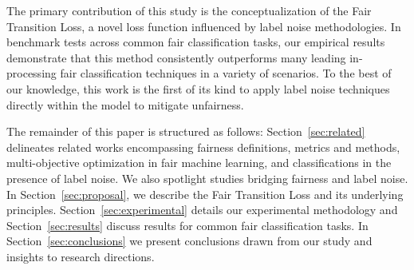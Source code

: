 The primary contribution of this study is the conceptualization of the Fair Transition Loss, a novel loss function influenced by label noise methodologies. In benchmark tests across common fair classification tasks, our empirical results demonstrate that this method consistently outperforms many leading in-processing fair classification techniques in a variety of scenarios. To the best of our knowledge, this work is the first of its kind to apply label noise techniques directly within the model to mitigate unfairness. 

The remainder of this paper is structured as follows: Section~\ref{sec:related} delineates related works encompassing fairness definitions, metrics and methods, multi-objective optimization in fair machine learning, and classifications in the presence of label noise. We also spotlight studies bridging fairness and label noise. In Section~\ref{sec:proposal}, we describe the Fair Transition Loss and its underlying principles. Section~\ref{sec:experimental} details our experimental methodology and Section~\ref{sec:results} discuss results for common fair classification tasks. In Section~\ref{sec:conclusions} we present conclusions drawn from our study and insights to research directions.
